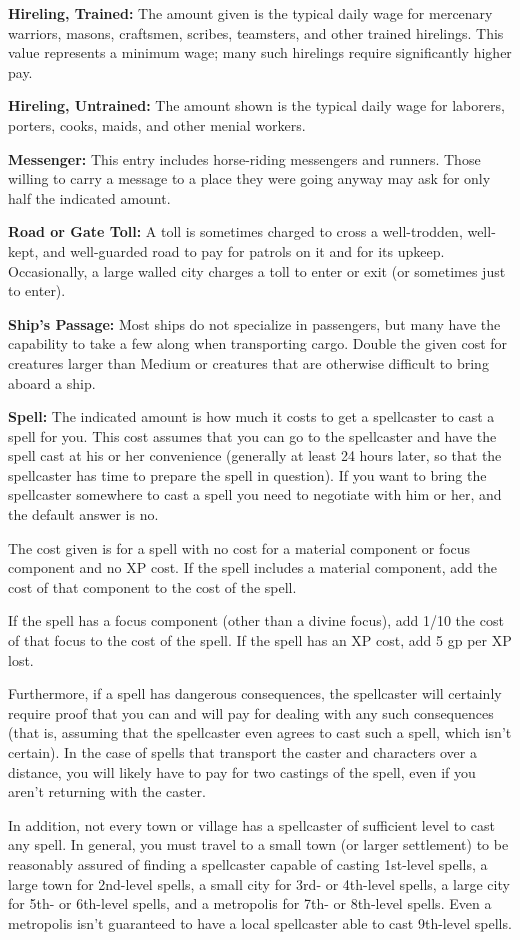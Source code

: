 \textbf{Hireling, Trained:} The amount given is the typical daily wage for mercenary 
warriors, masons, craftsmen, scribes, teamsters, and other trained hirelings. This 
value represents a minimum wage; many such hirelings require significantly higher 
pay.

\textbf{Hireling, Untrained:} The amount shown is the typical daily wage for laborers, 
porters, cooks, maids, and other menial workers.

\textbf{Messenger:} This entry includes horse-riding messengers and runners. Those 
willing to carry a message to a place they were going anyway may ask for only half 
the indicated amount.

\textbf{Road or Gate Toll:} A toll is sometimes charged to cross a well-trodden, 
well-kept, and well-guarded road to pay for patrols on it and for its upkeep. Occasionally, 
a large walled city charges a toll to enter or exit (or sometimes just to enter).

\textbf{Ship's Passage:} Most ships do not specialize in passengers, but many have 
the capability to take a few along when transporting cargo. Double the given cost 
for creatures larger than Medium or creatures that are otherwise difficult to bring 
aboard a ship.

\textbf{Spell:} The indicated amount is how much it costs to get a spellcaster 
to cast a spell for you. This cost assumes that you can go to the spellcaster and 
have the spell cast at his or her convenience (generally at least 24 hours later, 
so that the spellcaster has time to prepare the spell in question). If you want 
to bring the spellcaster somewhere to cast a spell you need to negotiate with him 
or her, and the default answer is no.

The cost given is for a spell with no cost for a material component or focus component 
and no XP cost. If the spell includes a material component, add the cost of that 
component to the cost of the spell.

If the spell has a focus component (other than a divine focus), add 1/10 the cost 
of that focus to the cost of the spell. If the spell has an XP cost, add 5 gp per 
XP lost. 

Furthermore, if a spell has dangerous consequences, the spellcaster will certainly 
require proof that you can and will pay for dealing with any such consequences 
(that is, assuming that the spellcaster even agrees to cast such a spell, which 
isn't certain). In the case of spells that transport the caster and characters 
over a distance, you will likely have to pay for two castings of the spell, even 
if you aren't returning with the caster.

In addition, not every town or village has a spellcaster of sufficient level to 
cast any spell. In general, you must travel to a small town (or larger settlement) 
to be reasonably assured of finding a spellcaster capable of casting 1st-level 
spells, a large town for 2nd-level spells, a small city for 3rd- or 4th-level spells, 
a large city for 5th- or 6th-level spells, and a metropolis for 7th- or 8th-level 
spells. Even a metropolis isn't guaranteed to have a local spellcaster able to 
cast 9th-level spells.